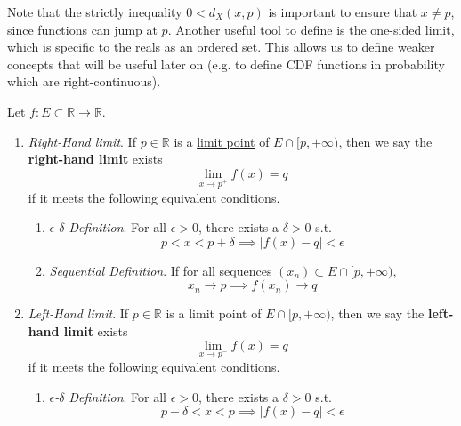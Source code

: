   Note that the strictly inequality $0 < d_X (x, p)$ is important to ensure that $x \neq p$, since functions can jump at $p$. Another useful tool to define is the one-sided limit, which is specific to the reals as an ordered set. This allows us to define weaker concepts that will be useful later on (e.g. to define CDF functions in probability which are right-continuous). 

  \begin{definition}
    \label{def:one-sided-limit-of-a-real-valued-function}
    Let $f: E \subset \mathbb{R} \to \mathbb{R}$. 
    \begin{enumerate}
      \item \textit{Right-Hand limit}. If $p \in \mathbb{R}$ is a \hyperref[pst-def:limit-point]{limit point} of $E \cap [p, +\infty)$, then we say the \textbf{right-hand limit} exists
        \begin{equation}
          \lim_{x \to p^+} f(x) = q
        \end{equation}
        if it meets the following equivalent conditions. 
        \begin{enumerate}
          \item \textit{$\epsilon$-$\delta$ Definition}. For all $\epsilon > 0$, there exists a $\delta > 0$ s.t. 
            \begin{equation}
              p < x < p + \delta \implies |f(x) - q| < \epsilon
            \end{equation}

          \item \textit{Sequential Definition}. If for all sequences $(x_n) \subset E \cap [p, +\infty)$, 
            \begin{equation}
              x_n \to p \implies f(x_n) \to q
            \end{equation}
        \end{enumerate}

      \item \textit{Left-Hand limit}. If $p \in \mathbb{R}$ is a limit point of $E \cap [p, +\infty)$, then we say the \textbf{left-hand limit} exists 
        \begin{equation}
          \lim_{x \to p^-} f(x) = q
        \end{equation}
        if it meets the following equivalent conditions. 
        \begin{enumerate}
          \item \textit{$\epsilon$-$\delta$ Definition}. For all $\epsilon > 0$, there exists a $\delta > 0$ s.t. 
            \begin{equation}
              p - \delta < x < p \implies |f(x) - q| < \epsilon
            \end{equation}


\end{enumerate}
\end{enumerate}
\end{definition}
